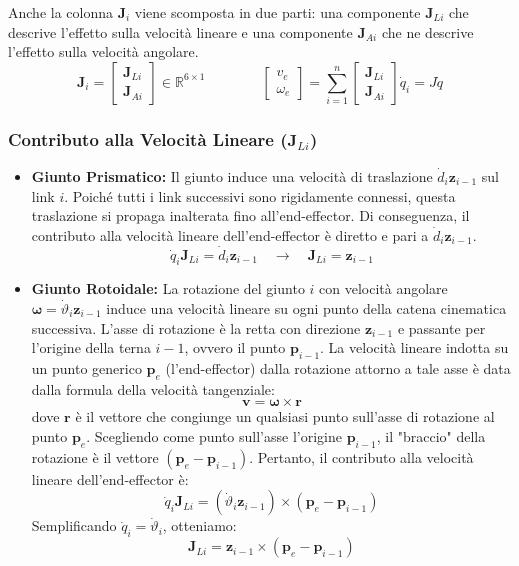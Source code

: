 ﻿\documentclass[11pt, a4paper]{article}
\begin{document}
Anche la colonna \(\bm{J}_i\) viene scomposta in due parti: una componente \(\bm{J}_{Li}\) che descrive l'effetto sulla velocità lineare e una componente \(\bm{J}_{Ai}\) che ne descrive l'effetto sulla velocità angolare.
\[
    \bm{J}_i = \begin{bmatrix}
        \bm{J}_{Li} \\
        \bm{J}_{Ai}
    \end{bmatrix}
    \in \mathbb{R}^{6 \times 1}
    \qquad\qquad
    \begin{bmatrix}
        v_e \\
        \omega_e
    \end{bmatrix}
    =
    \sum_{i=1}^{n}
    \begin{bmatrix}
        \bm{J}_{Li}\\
        \bm{J}_{Ai}
    \end{bmatrix}
    \dot{q}_i = J \dot{q}
\]

\subsubsection{Contributo alla Velocità Lineare (\texorpdfstring{$\mathbf{J}_{Li}$}{J Li})}
\begin{itemize}
    \item \textbf{Giunto Prismatico:} Il giunto induce una velocità di traslazione \(\dot{d}_i \bm{z}_{i-1}\) sul link \(i\). Poiché tutti i link successivi sono rigidamente connessi, questa traslazione si propaga inalterata fino all'end-effector. Di conseguenza, il contributo alla velocità lineare dell'end-effector è diretto e pari a \(\dot{d}_i \bm{z}_{i-1}\).
    \[
        \dot{q}_i \bm{J}_{Li} = \dot{d}_i \bm{z}_{i-1} \quad \longrightarrow \quad \bm{J}_{Li} = \bm{z}_{i-1}
    \]

    \item \textbf{Giunto Rotoidale:} La rotazione del giunto \(i\) con velocità angolare \(\bm{\omega} = \dot{\vartheta}_i \bm{z}_{i-1}\) induce una velocità lineare su ogni punto della catena cinematica successiva. L'asse di rotazione è la retta con direzione \(\bm{z}_{i-1}\) e passante per l'origine della terna \(i-1\), ovvero il punto \(\bm{p}_{i-1}\).
    La velocità lineare indotta su un punto generico \(\bm{p}_e\) (l'end-effector) dalla rotazione attorno a tale asse è data dalla formula della velocità tangenziale:
    \[
        \bm{v} = \bm{\omega} \times \bm{r}
    \]
    dove \(\bm{r}\) è il vettore che congiunge un qualsiasi punto sull'asse di rotazione al punto \(\bm{p}_e\). Scegliendo come punto sull'asse l'origine \(\bm{p}_{i-1}\), il "braccio" della rotazione è il vettore \((\bm{p}_e - \bm{p}_{i-1})\).
    Pertanto, il contributo alla velocità lineare dell'end-effector è:
    \[
        \dot{q}_i \bm{J}_{Li} = (\dot{\vartheta}_i \bm{z}_{i-1}) \times (\bm{p}_e - \bm{p}_{i-1})
    \]
    Semplificando \(\dot{q}_i = \dot{\vartheta}_i\), otteniamo:
    \[
        \bm{J}_{Li} = \bm{z}_{i-1} \times (\bm{p}_e - \bm{p}_{i-1})
    \]
\end{itemize}
\end{document}
